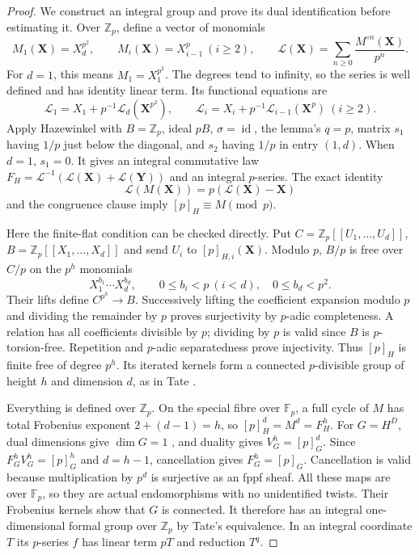 \documentclass[11pt,a4paper]{article}
\theoremstyle{definition}\newtheorem{remark}[theorem]{Remark}
\newcommand{\Z}{\mathbb Z}\newcommand{\Q}{\mathbb Q}\newcommand{\F}{\mathbb F}
\newcommand{\id}{\operatorname{id}}\newcommand{\Hom}{\operatorname{Hom}}
\begin{document}
\begin{proof}
We construct an integral group and prove its dual identification before estimating it. Over $\Z_p$, define a vector of monomials
\[
 M_1(\mathbf X)=X_d^{p^2},\qquad M_i(\mathbf X)=X_{i-1}^p\ (i\ge2),
 \qquad \mathcal L(\mathbf X)=\sum_{n\ge0}\frac{M^{\circ n}(\mathbf X)}{p^n}.
\]
For $d=1$, this means $M_1=X_1^{p^2}$. The degrees tend to infinity, so the series is well defined and has identity linear term. Its functional equations are
\[
 \mathcal L_1=X_1+p^{-1}\mathcal L_d(\mathbf X^{p^2}),\qquad
 \mathcal L_i=X_i+p^{-1}\mathcal L_{i-1}(\mathbf X^p)\ (i\ge2).
\]
Apply Hazewinkel \cite[Lemma 2.3, (2.2)--(2.6), p.~74]{Hazewinkel} with $B=\Z_p$, ideal $pB$, $\sigma=\id$, the lemma's $q=p$, matrix $s_1$ having $1/p$ just below the diagonal, and $s_2$ having $1/p$ in entry $(1,d)$. When $d=1$, $s_1=0$. It gives an integral commutative law $F_H=\mathcal L^{-1}(\mathcal L(\mathbf X)+\mathcal L(\mathbf Y))$ and an integral $p$-series. The exact identity
\[
 \mathcal L(M(\mathbf X))=p(\mathcal L(\mathbf X)-\mathbf X)
\]
and the congruence clause \cite[(2.8), p.~75]{Hazewinkel} imply $[p]_H\equiv M\pmod p$.

Here the finite-flat condition can be checked directly. Put $C=\Z_p[[U_1,\ldots,U_d]]$, $B=\Z_p[[X_1,\ldots,X_d]]$ and send $U_i$ to $[p]_{H,i}(\mathbf X)$. Modulo $p$, $B/p$ is free over $C/p$ on the $p^h$ monomials
\[
 X_1^{b_1}\cdots X_d^{b_d},\qquad
 0\le b_i<p\ (i<d),\quad 0\le b_d<p^2.
\]
Their lifts define $C^{p^h}\to B$. Successively lifting the coefficient expansion modulo $p$ and dividing the remainder by $p$ proves surjectivity by $p$-adic completeness. A relation has all coefficients divisible by $p$; dividing by $p$ is valid since $B$ is $p$-torsion-free. Repetition and $p$-adic separatedness prove injectivity. Thus $[p]_H$ is finite free of degree $p^h$. Its iterated kernels form a connected $p$-divisible group of height $h$ and dimension $d$, as in Tate \cite[\S2.2, Proposition 1, pp.~162--164]{Tate67}.

Everything is defined over $\Z_p$. On the special fibre over $\F_p$, a full cycle of $M$ has total Frobenius exponent $2+(d-1)=h$, so $[p]_H^d=M^d=F_H^h$. For $G=H^D$, dual dimensions give $\dim G=1$ \cite[\S2.3, Proposition 3, p.~166]{Tate67}, and duality gives $V_G^h=[p]_G^d$. Since $F_G^hV_G^h=[p]_G^h$ and $d=h-1$, cancellation gives $F_G^h=[p]_G$. Cancellation is valid because multiplication by $p^d$ is surjective as an fppf sheaf. All these maps are over $\F_p$, so they are actual endomorphisms with no unidentified twists. Their Frobenius kernels show that $G$ is connected. It therefore has an integral one-dimensional formal group over $\Z_p$ by Tate's equivalence. In an integral coordinate $T$ its $p$-series $f$ has linear term $pT$ and reduction $T^q$.


\end{proof}
\end{document}
